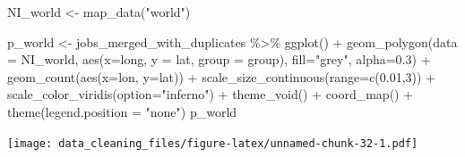 \documentclass[
]{article}
\newenvironment{Shaded}{\begin{snugshade}}{\end{snugshade}}
\newcommand{\DataTypeTok}[1]{\textcolor[rgb]{0.87,0.87,0.75}{#1}}
\newcommand{\DecValTok}[1]{\textcolor[rgb]{0.86,0.86,0.80}{#1}}
\newcommand{\FloatTok}[1]{\textcolor[rgb]{0.75,0.75,0.82}{#1}}
\newcommand{\KeywordTok}[1]{\textcolor[rgb]{0.94,0.87,0.69}{#1}}
\newcommand{\NormalTok}[1]{\textcolor[rgb]{0.80,0.80,0.80}{#1}}
\newcommand{\OperatorTok}[1]{\textcolor[rgb]{0.94,0.94,0.82}{#1}}
\newcommand{\StringTok}[1]{\textcolor[rgb]{0.80,0.58,0.58}{#1}}
\begin{document}
\begin{Shaded}
\begin{Highlighting}[]
\NormalTok{NI\_world \textless{}{-}}\StringTok{ }\KeywordTok{map\_data}\NormalTok{(}\StringTok{"world"}\NormalTok{)}

\NormalTok{p\_world \textless{}{-}}\StringTok{ }\NormalTok{jobs\_merged\_with\_duplicates }\OperatorTok{\%\textgreater{}\%}
\StringTok{  }\KeywordTok{ggplot}\NormalTok{() }\OperatorTok{+}
\StringTok{    }\KeywordTok{geom\_polygon}\NormalTok{(}\DataTypeTok{data =}\NormalTok{ NI\_world, }\KeywordTok{aes}\NormalTok{(}\DataTypeTok{x=}\NormalTok{long, }\DataTypeTok{y =}\NormalTok{ lat, }\DataTypeTok{group =}\NormalTok{ group), }\DataTypeTok{fill=}\StringTok{"grey"}\NormalTok{, }\DataTypeTok{alpha=}\FloatTok{0.3}\NormalTok{) }\OperatorTok{+}
\StringTok{    }\KeywordTok{geom\_count}\NormalTok{(}\KeywordTok{aes}\NormalTok{(}\DataTypeTok{x=}\NormalTok{lon, }\DataTypeTok{y=}\NormalTok{lat)) }\OperatorTok{+}
\StringTok{    }\KeywordTok{scale\_size\_continuous}\NormalTok{(}\DataTypeTok{range=}\KeywordTok{c}\NormalTok{(}\FloatTok{0.01}\NormalTok{,}\DecValTok{3}\NormalTok{)) }\OperatorTok{+}
\StringTok{    }\KeywordTok{scale\_color\_viridis}\NormalTok{(}\DataTypeTok{option=}\StringTok{"inferno"}\NormalTok{) }\OperatorTok{+}
\StringTok{    }\KeywordTok{theme\_void}\NormalTok{() }\OperatorTok{+}
\StringTok{    }\KeywordTok{coord\_map}\NormalTok{() }\OperatorTok{+}
\StringTok{    }\KeywordTok{theme}\NormalTok{(}\DataTypeTok{legend.position =} \StringTok{"none"}\NormalTok{)}
\NormalTok{p\_world}
\end{Highlighting}
\end{Shaded}

\texttt{[image: data\_cleaning\_files/figure-latex/unnamed-chunk-32-1.pdf]}
\end{document}
